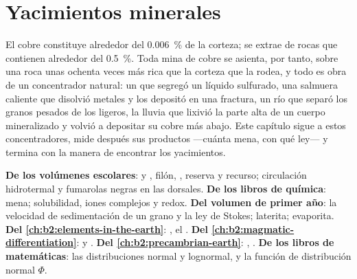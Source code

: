 \chapter{Yacimientos minerales}\label{ch:b2:ore-deposits}

El cobre constituye alrededor del \qty{0.006}{\percent} de la corteza; se extrae de rocas que contienen alrededor
del \qty{0.5}{\percent}. Toda mina de cobre se asienta, por tanto, sobre una roca unas ochenta veces más rica que la
corteza que la rodea, y todo  es obra de un concentrador natural: un  que
segregó un líquido sulfurado, una salmuera caliente que disolvió metales y los depositó en una fractura, un
río que separó los granos pesados de los ligeros, la lluvia que lixivió la parte alta de un cuerpo mineralizado y
volvió a depositar su cobre más abajo. Este capítulo sigue a estos concentradores, mide después sus
productos ---cuánta mena, con qué ley--- y termina con la manera de encontrar los yacimientos.

\begin{recall}
\textbf{De los volúmenes escolares}:  y , filón, , reserva y
recurso; circulación hidrotermal y fumarolas negras en las dorsales. \textbf{De los libros de
química}: mena; solubilidad, iones complejos y redox. \textbf{Del volumen de primer año}: la velocidad de
sedimentación de un grano y la ley de Stokes; laterita; evaporita. \textbf{Del
\cref{ch:b2:elements-in-the-earth}}: , el . \textbf{Del \cref{ch:b2:magmatic-differentiation}}:  y
. \textbf{Del \cref{ch:b2:precambrian-earth}}: , .
\textbf{De los libros de matemáticas}: las distribuciones normal y lognormal, y la función de
distribución normal $\Phi$.
\end{recall}

